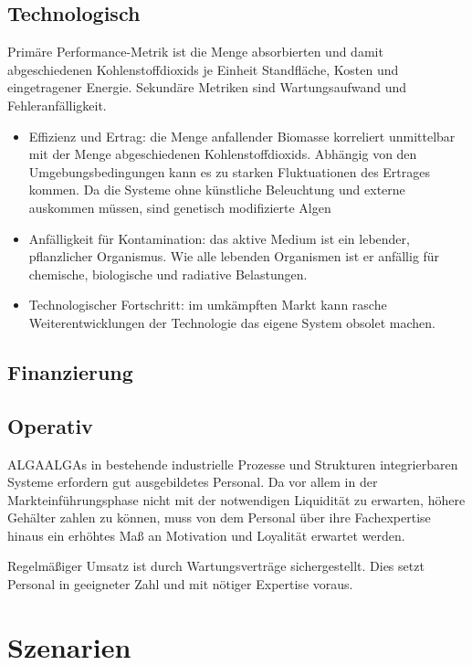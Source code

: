        \subsection{Technologisch}

            Primäre Performance-Metrik ist die Menge absorbierten und damit abgeschiedenen Kohlenstoffdioxids je Einheit Standfläche, Kosten und eingetragener Energie.
            Sekundäre Metriken sind Wartungsaufwand und Fehleranfälligkeit.
            \begin{itemize}
                \item Effizienz und Ertrag: die Menge anfallender Biomasse korreliert unmittelbar mit der Menge abgeschiedenen Kohlenstoffdioxids.
                Abhängig von den Umgebungsbedingungen kann es zu starken Fluktuationen des Ertrages kommen.
                Da die Systeme ohne künstliche Beleuchtung und externe  auskommen müssen, sind genetisch modifizierte Algen 
                \item Anfälligkeit für Kontamination: das aktive Medium ist ein lebender, pflanzlicher Organismus. Wie alle lebenden Organismen ist er anfällig für chemische, biologische und radiative Belastungen.
                \item Technologischer Fortschritt: im umkämpften Markt kann rasche Weiterentwicklungen der Technologie das eigene System obsolet machen.
            \end{itemize}
        \subsection{Finanzierung}

        \subsection{Operativ}
            ALGAALGAs in bestehende industrielle Prozesse und Strukturen integrierbaren Systeme erfordern gut ausgebildetes Personal.
            Da vor allem in der Markteinführungsphase nicht mit der notwendigen Liquidität zu erwarten, höhere Gehälter zahlen zu können, muss von dem Personal über ihre Fachexpertise hinaus ein erhöhtes Maß an Motivation und Loyalität erwartet werden.\par\medskip

            Regelmäßiger Umsatz ist durch Wartungsverträge sichergestellt.
            Dies setzt Personal in geeigneter Zahl und mit nötiger Expertise voraus.
    
    \section{Szenarien}

